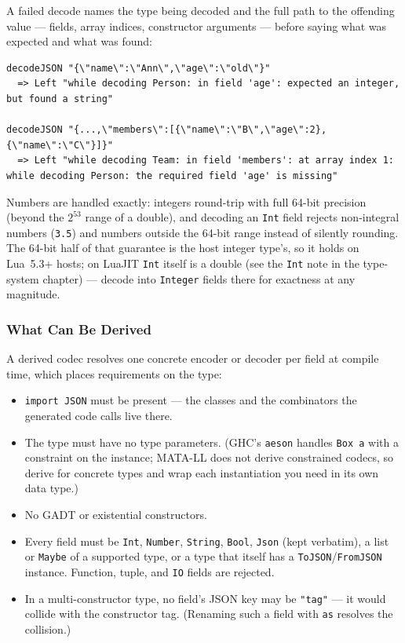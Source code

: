 \documentclass[11pt,a4paper]{article}
\begin{document}
A failed decode names the type being decoded and the full path to the
offending value --- fields, array indices, constructor arguments ---
before saying what was expected and what was found:

\begin{lstlisting}[language={}]
decodeJSON "{\"name\":\"Ann\",\"age\":\"old\"}"
  => Left "while decoding Person: in field 'age': expected an integer, but found a string"

decodeJSON "{...,\"members\":[{\"name\":\"B\",\"age\":2},{\"name\":\"C\"}]}"
  => Left "while decoding Team: in field 'members': at array index 1: while decoding Person: the required field 'age' is missing"
\end{lstlisting}

Numbers are handled exactly: integers round-trip with full 64-bit
precision (beyond the $2^{53}$ range of a double), and decoding an
\texttt{Int} field rejects non-integral numbers (\texttt{3.5}) and
numbers outside the 64-bit range instead of silently rounding.  The
64-bit half of that guarantee is the host integer type's, so it holds on
Lua~5.3+ hosts; on LuaJIT \texttt{Int} itself is a double (see the
\texttt{Int} note in the type-system chapter) --- decode into
\texttt{Integer} fields there for exactness at any magnitude.

\subsubsection{What Can Be Derived}

A derived codec resolves one concrete encoder or decoder per field at
compile time, which places requirements on the type:

\begin{itemize}[nosep]
  \item \texttt{import JSON} must be present --- the classes and the
        combinators the generated code calls live there.
  \item The type must have no type parameters.  (GHC's \texttt{aeson}
        handles \texttt{Box a} with a constraint on the instance;
        MATA-LL does not derive constrained codecs, so derive for
        concrete types and wrap each instantiation you need in its own
        data type.)
  \item No GADT or existential constructors.
  \item Every field must be \texttt{Int}, \texttt{Number},
        \texttt{String}, \texttt{Bool}, \texttt{Json} (kept verbatim),
        a list or \texttt{Maybe} of a supported type, or a type that
        itself has a \texttt{ToJSON}/\texttt{FromJSON} instance.
        Function, tuple, and \texttt{IO} fields are rejected.
  \item In a multi-constructor type, no field's JSON key may be
        \texttt{"tag"} --- it would collide with the constructor tag.
        (Renaming such a field with \texttt{as} resolves the
        collision.)
\end{itemize}
\end{document}
